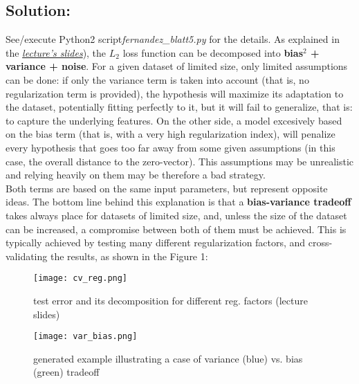 \documentclass[11pt]{scrartcl} %
\begin{document}
           \subsection*{Solution:}
           See/execute Python2 script{\it fernandez\_blatt5.py} for the details. As explained in the \href{http://www.ccc.cs.uni-frankfurt.de/wp-content/uploads/2016/10/week7.pdf}{{\it lecture's slides}}), the \(L_2\) loss function can be decomposed into \textbf{bias\(^2\) + variance + noise}. For a given dataset of limited size, only limited assumptions can be done: if only the variance term is taken into account (that is, no regularization term is provided), the hypothesis will maximize its adaptation to the dataset, potentially fitting perfectly to it, but it will fail to generalize, that is: to capture the underlying features. On the other side, a model excesively based on the bias term (that is, with a very high regularization index), will penalize every hypothesis that goes too far away from some given assumptions (in this case, the overall distance to the zero-vector). This assumptions may be unrealistic and relying heavily on them may be therefore a bad strategy.\\
           Both terms are based on the same input parameters, but represent opposite ideas. The bottom line behind this explanation is that a \textbf{bias-variance tradeoff} takes always place for datasets of limited size, and, unless the size of the dataset can be increased, a compromise between both of them must be achieved. This is typically achieved by testing many different regularization factors, and cross-validating the results, as shown in the Figure 1:
           \begin{figure}[ht]
	   \centering
           \texttt{[image: cv\_reg.png]}
	   \caption{test error and its decomposition for different reg. factors (lecture slides)}
	   \label{fig2}
           \end{figure}


           \begin{figure}[ht]
	   \centering
           \texttt{[image: var\_bias.png]}
	   \caption{generated example illustrating a case of variance (blue) vs. bias (green) tradeoff}
	   \label{fig2}
         \end{figure}

           
\end{document}
